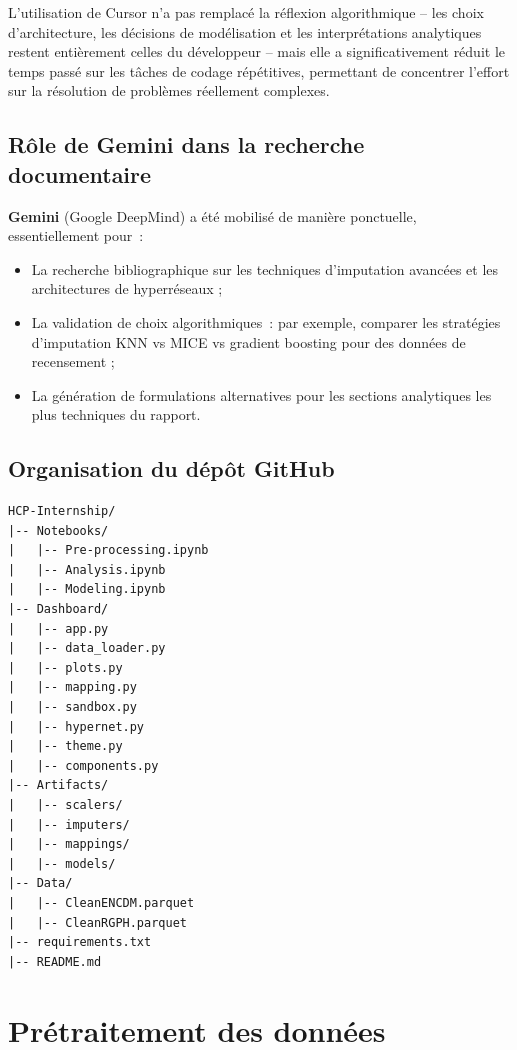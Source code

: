 \documentclass[12pt,a4paper]{report}
\begin{document}
L'utilisation de Cursor n'a pas remplacé la réflexion algorithmique -- les choix d'architecture, les décisions de modélisation et les interprétations analytiques restent entièrement celles du développeur -- mais elle a significativement réduit le temps passé sur les tâches de codage répétitives, permettant de concentrer l'effort sur la résolution de problèmes réellement complexes.

\section{Rôle de Gemini dans la recherche documentaire}

\textbf{Gemini} (Google DeepMind) a été mobilisé de manière ponctuelle, essentiellement pour~:

\begin{itemize}
  \item La recherche bibliographique sur les techniques d'imputation avancées et les architectures de hyperréseaux ;
  \item La validation de choix algorithmiques~: par exemple, comparer les stratégies d'imputation KNN vs MICE vs gradient boosting pour des données de recensement ;
  \item La génération de formulations alternatives pour les sections analytiques les plus techniques du rapport.
\end{itemize}

\section{Organisation du dépôt GitHub}

\begin{lstlisting}[style=treenostyle, caption={Structure du depot HCP-Internship (branche Dashboard)}]
HCP-Internship/
|-- Notebooks/
|   |-- Pre-processing.ipynb
|   |-- Analysis.ipynb
|   |-- Modeling.ipynb
|-- Dashboard/
|   |-- app.py
|   |-- data_loader.py
|   |-- plots.py
|   |-- mapping.py
|   |-- sandbox.py
|   |-- hypernet.py
|   |-- theme.py
|   |-- components.py
|-- Artifacts/
|   |-- scalers/
|   |-- imputers/
|   |-- mappings/
|   |-- models/
|-- Data/
|   |-- CleanENCDM.parquet
|   |-- CleanRGPH.parquet
|-- requirements.txt
|-- README.md
\end{lstlisting}

\chapter{Prétraitement des données}
\end{document}
